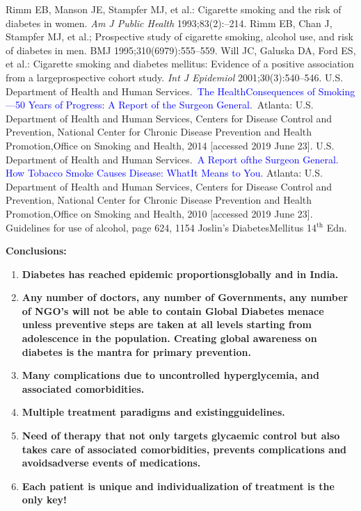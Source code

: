 \vspace{-\topsep}
\begin{thebibliography}{99}
\vspace{-\topsep}
\itemsep=0pt
 Rimm EB, Manson JE, Stampfer MJ, et al.: Cigarette smoking and the risk of diabetes in women. \textit{Am J Public Health} 1993;83(2):–214.
 Rimm EB, Chan J, Stampfer MJ, et al.; Prospective study of cigarette smoking, alcohol use, and risk of diabetes in men. BMJ 1995;310(6979):555–559.
 Will JC, Galuska DA, Ford ES, et al.: Cigarette smoking and dia\-betes mellitus: Evidence of a positive association from a large\break prospective cohort study. \textit{Int J Epidemiol} 2001;30(3):540–546.
 U.S. Department of Health and Human Services. \textcolor{blue}{The Health\break Consequences of Smoking—50 Years of Progress: A Report of the Surgeon General.} Atlanta: U.S. Department of Health and Human Services, Centers for Disease Control and Prevention, National Center for Chronic Disease Prevention and Health Promotion,\break Office on Smoking and Health, 2014 [accessed 2019 June 23].
 U.S. Department of Health and Human Services. \textcolor{blue}{A Report of\break the Surgeon General. How Tobacco Smoke Causes Disease: What\break It Means to You.} Atlanta: U.S. Department of Health and Human Services, Centers for Disease Control and Prevention, National Center for Chronic Disease Prevention and Health Promotion,\break Office on Smoking and Health, 2010 [accessed 2019 June 23].
 Guidelines for use of alcohol, page 624, 1154 Joslin’s Diabetes\break Mellitus 14$^{\text{th}}$ Edn.
\end{thebibliography}

{\Large
\noindent\textbf{Conclusions:}

\vspace{-\topsep}
\begin{enumerate}[•]
\itemsep=0pt
\item \textbf{Diabetes has reached epidemic proportions\break globally and in India.}
\item \textbf{Any number of doctors, any number of Governments, any number of NGO's will not be able to contain Global Diabetes menace unless preven\-tive steps are taken at all levels starting from adolescence in the population. Creating global awareness on diabetes is the mantra for primary prevention.}
\item \textbf{Many complications due to uncontrolled hyperglycemia, and associated comorbidities.}
\item \textbf{Multiple treatment paradigms and existing\break guidelines.}
\item \textbf{Need of therapy that not only targets glycaemic control but also takes care of associated comorbidities, prevents com\-plications and avoids\break adverse events of medications.}
\item \textbf{Each patient is unique and individualization of treatment is the only key!}
\end{enumerate}

}


